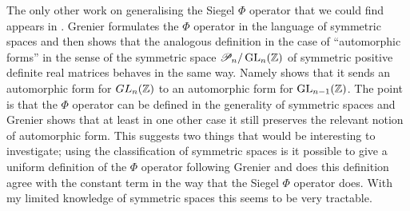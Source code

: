 The only other work on generalising the Siegel \(\Phi\) operator that we could find appears in \cite{grenierAnalogueSiegelsFOperator1992}. 
Grenier formulates the \(\Phi\) operator in the language of symmetric spaces \cite[Ch. 2]{terrasHarmonicAnalysisSymmetric2016} and then shows that the analogous definition in the case of ``automorphic forms'' in the sense of the symmetric space \(\mathscr{P}_n/\GL_n(\Z)\) of symmetric positive definite real matrices \cite[1.5.1]{terrasHarmonicAnalysisSymmetric2016} behaves in the same way. Namely \cite[Thm. 2]{grenierAnalogueSiegelsFOperator1992} shows that it sends an automorphic form for \(GL_n(\Z)\) to an automorphic form for \(\GL_{n-1}(\Z)\). The point is that the \(\Phi\) operator can be defined in the generality of symmetric spaces and Grenier shows that at least in one other case it still preserves the relevant notion of automorphic form. This suggests two things that would be interesting to investigate; using the classification of symmetric spaces is it possible to give a uniform definition of the \(\Phi\) operator following Grenier and does this definition agree with the constant term in the way that the Siegel \(\Phi\) operator does. With my limited knowledge of symmetric spaces this seems to be very tractable.


